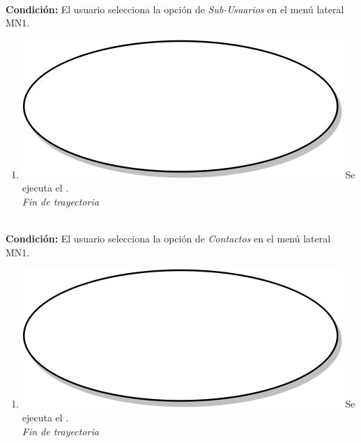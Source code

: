 \textbf{} \\
\textbf{Condición:} El usuario selecciona la opción de \textit{Sub-Usuarios} en el menú lateral MN1. \\
 \begin{enumerate}[label=D\arabic*]
    \item {\includegraphics[scale=.05]{Capitulo3/img/proceso.png} Se ejecuta el \textbf{}.} \\
    \textit{Fin de trayectoria} \\
\end{enumerate}

\textbf{} \\
\textbf{Condición:} El usuario selecciona la opción de \textit{Contactos} en el menú lateral MN1. \\
 \begin{enumerate}[label=E\arabic*]
    \item {\includegraphics[scale=.05]{Capitulo3/img/proceso.png} Se ejecuta el \textbf{}.} \\
    \textit{Fin de trayectoria} \\
\end{enumerate}

